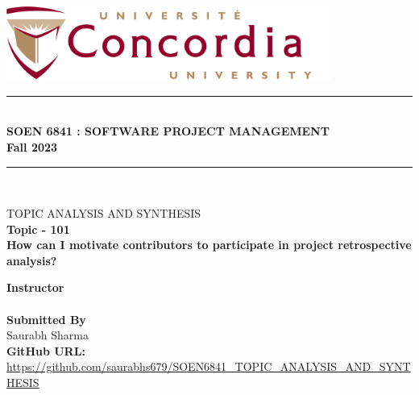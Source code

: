 \begin{titlepage}
\newcommand{\HRule}{\rule{\linewidth}{0.5mm}}                           %
\center


\includegraphics[width=0.8\textwidth]{concordia_logo.png}\\[0.2cm]  %

\HRule \\[0.8cm]
\textbf{\Large SOEN 6841 : SOFTWARE PROJECT MANAGEMENT}\\[0.2cm] \textbf{\Large Fall 2023}
\HRule \\
\vfill

\textsc{\Large TOPIC ANALYSIS AND SYNTHESIS}\\[0.7cm] 
\huge
\textbf{Topic - 101}\\
\textbf{\Large How can I motivate contributors to
participate in project retrospective
analysis? }\\
\vfill 

\large
\textbf{Instructor}\\
\\[1cm]

 \textbf{Submitted By}\\
Saurabh Sharma \\[1cm]
\textbf{GitHub URL:} \\[0.2cm]
\url{https://github.com/saurabhs679/SOEN6841_TOPIC_ANALYSIS_AND_SYNTHESIS}
\vfill
\end{titlepage}